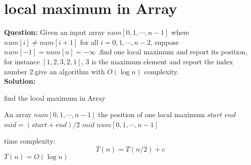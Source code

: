 \section{local maximum in Array}
\textbf{Question:}
Given an input array $num[0,1,\cdots, n-1]$ where $num[i] \neq num[i+1]$ for all $i = 0,1,\cdots, n-2$, suppose $num[-1] = num[n] = -\infty$ .find one local maximum and report its position, for instance $[1,2,3,2,1]$, $3$ is the maximum element and report the index number $2$.give an algorithm with $O(\log n)$ complexity. \\
\textbf{Solution:}
 	\begin{algorithm}[H]
 		\caption{find the local maximum in Array}
 		\begin{algorithmic}[1]
 			\Require An array $num[0,1,\cdots, n-1]$	
 			\Ensure  the position of one local maximum
			 			\State \Return $start$
			 		\Else
				 		\State \Return $end$
				 	\EndIf 
	 			\EndIf
	 			\State $mid = (start + end)/2$
		 			\State \Return $mid$
			 		\State \Return {}
			 	\Else
				 	\State \Return {}
				 \EndIf 
 			\EndFunction 
		  {$num[0,1,\cdots, n-1]$}
			 \State \Return {}
		 \EndFunction 	
 		\end{algorithmic}	
 	\end{algorithm}
 time complexity:
  \[
	  T(n) = T(n/2) + c
  \]
  $T(n) = O(\log n)$
